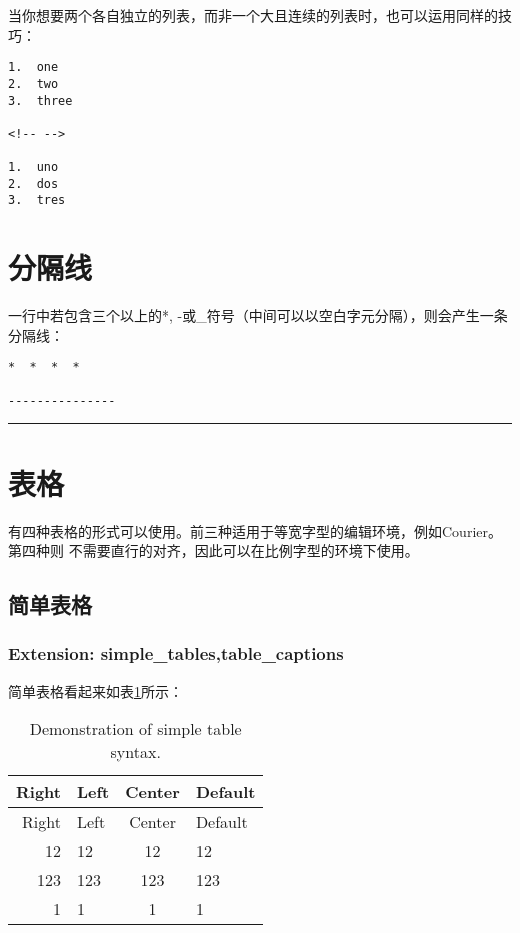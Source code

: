 \documentclass[fancyhdr,bookmark]{ctexbook}
\begin{document}
当你想要两个各自独立的列表，而非一个大且连续的列表时，也可以运用同样的技巧：

\begin{lstlisting}
1.  one
2.  two
3.  three

<!-- -->

1.  uno
2.  dos
3.  tres
\end{lstlisting}

\hypertarget{ux5206ux9694ux7ebf}{%
\section{分隔线}\label{ux5206ux9694ux7ebf}}

一行中若包含三个以上的*,
-或\_符号（中间可以以空白字元分隔），则会产生一条分隔线：

\begin{lstlisting}
*  *  *  *

---------------
\end{lstlisting}

\begin{center}\rule{0.5\linewidth}{\linethickness}\end{center}

\hypertarget{ux8868ux683c}{%
\section{表格}\label{ux8868ux683c}}

有四种表格的形式可以使用。前三种适用于等宽字型的编辑环境，例如Courier。第四种则
不需要直行的对齐，因此可以在比例字型的环境下使用。

\hypertarget{ux7b80ux5355ux8868ux683c}{%
\subsection{简单表格}\label{ux7b80ux5355ux8868ux683c}}

\hypertarget{extension-simple_tablestable_captions}{%
\subsubsection{Extension:
simple\_tables,table\_captions}\label{extension-simple_tablestable_captions}}

简单表格看起来如表\ref{table:simpletable}所示：

\begin{longtable}[]{@{}rlcl@{}}
\caption{Demonstration of simple table
syntax.\label{table:simpletable}}\tabularnewline
\toprule
Right & Left & Center & Default\tabularnewline
\midrule
\endfirsthead
\toprule
Right & Left & Center & Default\tabularnewline
\midrule
\endhead
12 & 12 & 12 & 12\tabularnewline
123 & 123 & 123 & 123\tabularnewline
1 & 1 & 1 & 1\tabularnewline
\bottomrule
\end{longtable}
\end{document}
